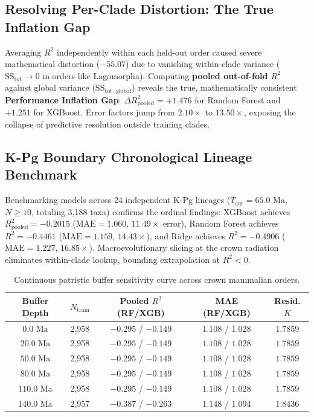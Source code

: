 \documentclass[sigconf,nonacm]{acmart}
\begin{document}
\subsection{Resolving Per-Clade Distortion: The True Inflation Gap}
Averaging $R^2$ independently within each held-out order caused severe mathematical distortion ($-55.07$) due to vanishing within-clade variance ($\text{SS}_{\text{tot}} \to 0$ in orders like Lagomorpha). Computing \textbf{pooled out-of-fold $R^2$} against global variance ($\text{SS}_{\text{tot, global}}$) reveals the true, mathematically consistent \textbf{Performance Inflation Gap}: $\Delta R^2_{\text{pooled}} = +1.476$ for Random Forest and $+1.251$ for XGBoost. Error factors jump from $2.10\times$ to $13.50\times$, exposing the collapse of predictive resolution outside training clades.

\subsection{K-Pg Boundary Chronological Lineage Benchmark}
Benchmarking models across 24 independent K-Pg lineages ($T_{\text{cut}} = 65.0\text{ Ma}$, $N \ge 10$, totaling 3,188 taxa) confirms the ordinal findings: XGBoost achieves $R^2_{\text{pooled}} = -0.2015$ ($\text{MAE} = 1.060$, $11.49\times$ error), Random Forest achieves $R^2 = -0.4461$ ($\text{MAE} = 1.159$, $14.43\times$), and Ridge achieves $R^2 = -0.4906$ ($\text{MAE} = 1.227$, $16.85\times$). Macroevolutionary slicing at the crown radiation eliminates within-clade lookup, bounding extrapolation at $R^2 < 0$.

\begin{table}[h]
\centering
\caption{Continuous patristic buffer sensitivity curve across crown mammalian orders.}
\label{tab:buffer}
\small
\begin{tabular}{ccccc}
\toprule
\textbf{Buffer Depth} & \textbf{$N_{\text{train}}$} & \textbf{Pooled $R^2$ (RF/XGB)} & \textbf{MAE (RF/XGB)} & \textbf{Resid. $K$} \\
\midrule
$0.0\text{ Ma}$ & 2,958 & $-0.295$ / $-0.149$ & $1.108$ / $1.028$ & $1.7859$ \\
$20.0\text{ Ma}$ & 2,958 & $-0.295$ / $-0.149$ & $1.108$ / $1.028$ & $1.7859$ \\
$50.0\text{ Ma}$ & 2,958 & $-0.295$ / $-0.149$ & $1.108$ / $1.028$ & $1.7859$ \\
$80.0\text{ Ma}$ & 2,958 & $-0.295$ / $-0.149$ & $1.108$ / $1.028$ & $1.7859$ \\
$110.0\text{ Ma}$ & 2,958 & $-0.295$ / $-0.149$ & $1.108$ / $1.028$ & $1.7859$ \\
$140.0\text{ Ma}$ & 2,957 & $-0.387$ / $-0.263$ & $1.148$ / $1.094$ & $1.8436$ \\
\bottomrule
\end{tabular}
\end{table}
\end{document}
